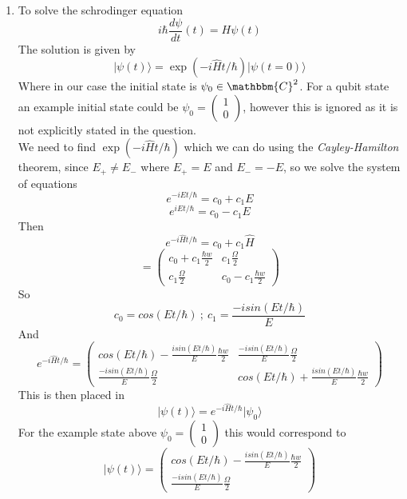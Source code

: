 \documentclass[12pt]{article}
\newcommand{\ket}[1]{\vert{#1}\rangle}
\begin{document}
\begin{enumerate}
\begin{enumerate}
    \item To solve the schrodinger equation 
    $$ i \hbar \frac{d \psi}{dt} (t) = H \psi (t) $$
    The solution is given by 
    $$ \ket{\psi(t)} = \exp(-i \hat{H} t / \hbar) \ket{\psi (t=0)} $$
    Where in our case the initial state is $\psi_0 \in \mathbbm{C}^2 $. For a qubit state an example initial state could be $\psi_0 = \left(\begin{array}{ccc} 1 \\ 0 \end{array}\right)$, however this is ignored as it is not explicitly stated in the question. 
    \\
    We need to find $\exp(-i \hat{H} t / \hbar)$ which we can do using the \emph{Cayley-Hamilton} theorem, since $E_+ \neq E_-$ where $E_+ = E$ and $E_- = -E$, so we solve the system of equations 
    $$ e^{-i Et / \hbar} = c_0 + c_1 E $$
    $$ e^{i Et / \hbar} = c_0 -c_1 E$$
    Then 
    $$ e^{-i \hat{H} t/ \hbar} = c_0 + c_1 \hat{H} $$
    $$ =  \left(\begin{array}{ccc} c_0 + c_1\frac{\hbar w}{2} & c_1\frac{\Omega}{2} \\ c_1\frac{\Omega}{2} & c_0 -c_1\frac{\hbar w}{2} \end{array}\right)$$
    So 
    $$ c_0 = cos(Et / \hbar) \ ; \ c_1 = \frac{-isin(Et / \hbar)}{E} $$
    And 
    $$ e^{-i \hat{H} t/ \hbar} = \left(\begin{array}{ccc} cos(Et / \hbar) - \frac{isin(Et / \hbar)}{E} \frac{\hbar w}{2} & \frac{-isin(Et / \hbar)}{E} \frac{\Omega}{2} \\ \frac{-isin(Et / \hbar)}{E} \frac{\Omega}{2} & cos(Et / \hbar) + \frac{isin(Et / \hbar)}{E} \frac{\hbar w}{2} \end{array}\right)$$
    This is then placed in 
    $$ \ket{\psi(t)} = e^{-i \hat{H} t/ \hbar} \ket{\psi_0} $$
    For the example state above $ \psi_0 = \left(\begin{array}{ccc} 1 \\ 0 \end{array}\right)$ this would correspond to 
    $$ \ket{\psi(t)} = \left(\begin{array}{ccc} cos(Et / \hbar)-\frac{isin(Et / \hbar)}{E} \frac{\hbar w}{2} \\ \frac{-isin(Et / \hbar)}{E}\frac{\Omega}{2} \end{array}\right)$$


\end{enumerate}
\end{enumerate}
\end{document}
